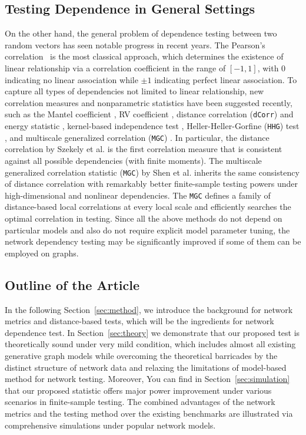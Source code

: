 \documentclass[11pt]{article}
\theoremstyle{definition}
\begin{document}
\subsection{Testing Dependence in General Settings}
On the other hand, the general problem of dependence testing between two random vectors has seen notable progress in recent years. The Pearson's correlation~\cite{Pearson1895} is the most classical approach, which determines the existence of linear relationship via a correlation coefficient in the range of $[-1,1]$, with $0$ indicating no linear association while $\pm 1$ indicating perfect linear association. To capture all types of dependencies not limited to linear relationship, new correlation measures and nonparametric statistics have been suggested recently, such as the Mantel coefficient \cite{mantel1967}, RV coefficient \cite{RobertEscoufier1976}, distance correlation (\texttt{dCorr}) and energy statistic \cite{szekely2007measuring,szekelyRizzo2013a, RizzoSzekely2016}, kernel-based independence test \cite{GrettonGyorfi2010}, Heller-Heller-Gorfine (\texttt{HHG}) test \cite{HellerGorfine2013,heller2016consistent}, and multiscale generalized correlation (\texttt{MGC}) \cite{shen2016discovering}. In particular, the distance correlation by Szekely et al. \cite{szekely2007measuring} is the first correlation measure that is consistent against all possible dependencies (with finite moments). The multiscale generalized correlation statistic (\texttt{MGC}) by Shen et al. \cite{shen2016discovering} inherits the same consistency of distance correlation with remarkably better finite-sample testing powers under high-dimensional and nonlinear dependencies. The \texttt{MGC} defines a family of distance-based local correlations at every local scale and efficiently searches the optimal correlation in testing. Since all the above methods do not depend on particular models and also do not require explicit model parameter tuning, the network dependency testing may be significantly improved if some of them can be employed on graphs.

\subsection{Outline of the Article}
In the following Section~\ref{sec:method}, we introduce the background for network metrics and distance-based tests, which will be the ingredients for network dependence test. In Section~\ref{sec:theory} we demonstrate that our proposed test is theoretically sound under very mild condition, which includes almost all existing generative graph models while overcoming the theoretical barricades by the distinct structure of network data and relaxing the limitations of model-based method for network testing. Moreover, You can find in Section~\ref{sec:simulation} that our proposed statistic offers major power improvement under various scenarios in finite-sample testing. The combined advantages of the network metrics and the testing method over the existing benchmarks are illustrated via comprehensive simulations under popular network models.
\end{document}
